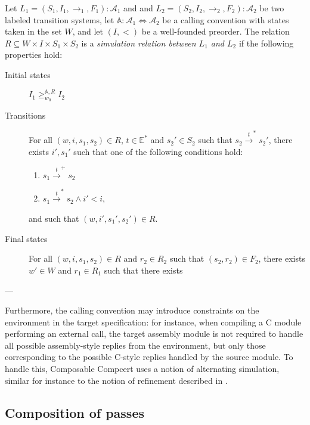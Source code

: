 \begin{definition}
Let $L_1 = (S_1, I_1, \rightarrow_1, F_1) : \mathcal{A}_1$ and
and $L_2 = (S_2, I_2, \rightarrow_2, F_2) : \mathcal{A}_2$
be two labeled transition systems,
let $\mathbb{A} : \mathcal{A}_1 \Leftrightarrow \mathcal{A}_2$
be a calling convention with states taken in the set $W$, and
let $(I, <)$ be a well-founded preorder.
The relation $R \subseteq W \times I \times S_1 \times S_2$
is a \emph{simulation relation between $L_1$ and $L_2$}
if the following properties hold:
\begin{description}
\item[Initial states]
  $I_1 \ge^{\mathbb{A},R}_{w_0} I_2$
\item[Transitions]
  For all $(w, i, s_1, s_2) \in R$, $t \in \mathbb{E}^*$ and $s_2' \in S_2$
  such that $s_2 \xrightarrow{t}^* s_2'$,
  there exists $i', s_1'$ such that one of the following conditions hold:
  \begin{enumerate}
    \item $s_1 \xrightarrow{t}^+ s_2$
    \item $s_1 \xrightarrow{t}^* s_2 \wedge i' < i$,
  \end{enumerate}
  and such that $(w, i', s_1', s_2') \in R$.
\item[Final states]
  For all $(w, i, s_1, s_2) \in R$ and $r_2 \in R_2$
  such that $(s_2, r_2) \in F_2$,
  there exists $w' \in W$ and $r_1 \in R_1$
  such that 
  there exists 

\end{description}
\end{definition}

---

Furthermore,
the calling convention may introduce
constraints on the environment in the target specification:
for instance,
when compiling a C module performing an external call,
the target assembly module is not required to handle
all possible assembly-style replies from the environment,
but only those corresponding to the possible C-style replies
handled by the source module.
To handle this,
Composable Compcert uses a notion of alternating simulation,
similar for instance to the notion of refinement
described in \cite{gmos}.


\subsection{Composition of passes} %

